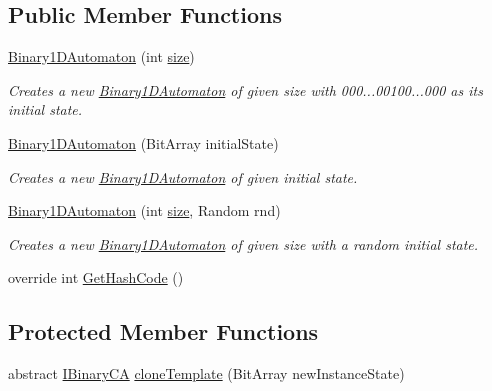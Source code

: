 \subsection*{Public Member Functions}
\begin{DoxyCompactItemize}
\item 
\hyperlink{class_cellular_1_1_binary1_d_automaton_a430f4985d036b8e48bfc785fe57b2bd1}{Binary1\+D\+Automaton} (int \hyperlink{class_cellular_1_1_automaton1_d_a915129ccf0f1e7092844c99ce6a28e5b}{size})
\begin{DoxyCompactList}\small\item\em Creates a new {\ttfamily \hyperlink{class_cellular_1_1_binary1_d_automaton}{Binary1\+D\+Automaton}} of given size with 000...00100...000 as its initial state. \end{DoxyCompactList}\item 
\hyperlink{class_cellular_1_1_binary1_d_automaton_a5c20fa6b3f7ffdd92187d216929099d4}{Binary1\+D\+Automaton} (Bit\+Array initial\+State)
\begin{DoxyCompactList}\small\item\em Creates a new {\ttfamily \hyperlink{class_cellular_1_1_binary1_d_automaton}{Binary1\+D\+Automaton}} of given initial state. \end{DoxyCompactList}\item 
\hyperlink{class_cellular_1_1_binary1_d_automaton_af4e1fb39b1b0dad8c3ab648c7ba0ba8c}{Binary1\+D\+Automaton} (int \hyperlink{class_cellular_1_1_automaton1_d_a915129ccf0f1e7092844c99ce6a28e5b}{size}, Random rnd)
\begin{DoxyCompactList}\small\item\em Creates a new {\ttfamily \hyperlink{class_cellular_1_1_binary1_d_automaton}{Binary1\+D\+Automaton}} of given size with a random initial state. \end{DoxyCompactList}\item 
override int \hyperlink{class_cellular_1_1_binary1_d_automaton_add2d1cf0d8d25af3ac4af819be2561b9}{Get\+Hash\+Code} ()
\end{DoxyCompactItemize}
\subsection*{Protected Member Functions}
\begin{DoxyCompactItemize}
\item 
abstract \hyperlink{interface_cellular_1_1_i_binary_c_a}{I\+Binary\+C\+A} \hyperlink{class_cellular_1_1_binary1_d_automaton_a38ac5ae077c5d31356d278247fbab40a}{clone\+Template} (Bit\+Array new\+Instance\+State)
\end{DoxyCompactItemize}
